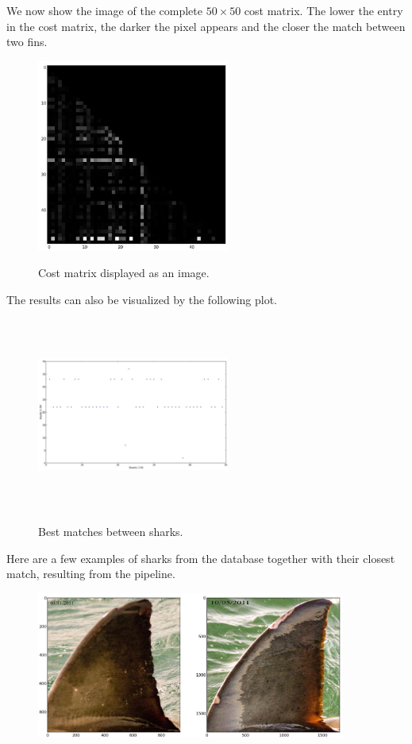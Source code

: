 \documentclass[a4paper,10pt]{article}
\begin{document}
We now show the image of the complete $50 \times 50$ cost matrix.  The lower the entry in the cost matrix, the darker the pixel appears and the closer the match between two fins.  \\

\begin{figure}[H]
\centering
\includegraphics[width=2.5in]{compmatrix.jpg} 
\label{fig4}
\caption{Cost matrix displayed as an image.}
\end{figure}

The results can also be visualized by the following plot.
\begin{figure}[H]
\centering
\includegraphics[width=2.5in, height=2.5in]{plot.jpg} 
\label{fig5}
\caption{Best matches between sharks.}
\end{figure}

Here are a few examples of sharks from the database together with their closest match, resulting from the pipeline. \\

\begin{figure}[H]
\centering
\includegraphics[width=4in]{sharkmatch1.jpg} 
\label{fig6}
\end{figure}
\end{document}
